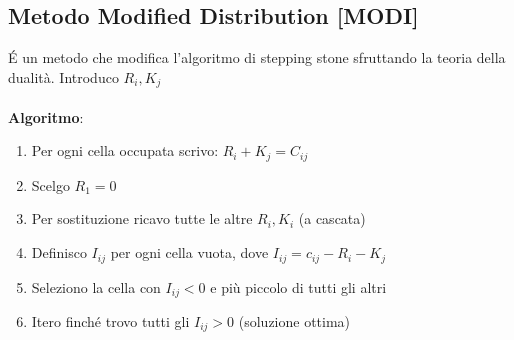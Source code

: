 \documentclass[12pt,a4paper]{article}
\begin{document}
\subsection{Metodo Modified Distribution [MODI]}
\'E un metodo che modifica l'algoritmo di stepping stone sfruttando la teoria della dualità. Introduco $R_i, K_j$\\
\\
\textbf{Algoritmo}:
\begin{enumerate}
\item Per ogni cella occupata scrivo: $R_i+K_j = C_{ij}$
\item Scelgo $R_1=0$
\item Per sostituzione ricavo tutte le altre $R_i, K_i$ (a cascata)
\item Definisco $I_{ij}$ per ogni cella vuota, dove $I_{ij} = c_{ij}-R_i-K_j$
\item Seleziono la cella con $I_{ij} < 0$ e più piccolo di tutti gli altri
\item Itero finché trovo tutti gli $I_{ij} >0$ (soluzione ottima)
\end{enumerate}
\end{document}
